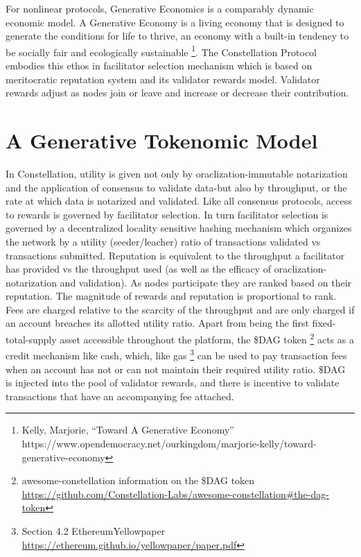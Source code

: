 \documentclass{article}
\begin{document}
For nonlinear protocols, Generative Economics is a comparably dynamic economic model. A Generative Economy is a living economy that is designed to generate the conditions for life to thrive, an economy with a built-in tendency to be socially fair and ecologically sustainable 
\footnote{Kelly, Marjorie, ``Toward A Generative Economy'' \\ https://www.opendemocracy.net/ourkingdom/marjorie-kelly/toward-generative-economy}. 
The Constellation Protocol embodies this ethos in facilitator selection mechanism which is based on meritocratic reputation system and its validator rewards model. Validator rewards adjust as nodes join or leave and increase or decrease their contribution.

\section{A Generative Tokenomic Model}
In Constellation, utility is given not only by oraclization-immutable notarization and the application of consensus to validate data-but also by throughput, or the rate at which data is notarized and validated. Like all consensus protocols, access to rewards is governed by facilitator selection. In turn facilitator selection is governed by a decentralized locality sensitive hashing mechanism which organizes the network by a utility (seeder/leacher) ratio of transactions validated vs transactions submitted. Reputation is equivalent to the throughput a facilitator has provided vs the throughput used (as well as the efficacy of oraclization-notarization and validation). As nodes participate they are ranked based on their reputation. The magnitude of rewards and reputation is proportional to rank. Fees are charged relative to the scarcity of the throughput and are only charged if an account breaches its allotted utility ratio. Apart from being the first fixed-total-supply asset accessible throughout the platform, the \$DAG token 
\footnote{awesome-constellation information on the \$DAG token\\ \url{https://github.com/Constellation-Labs/awesome-constellation\#the-dag-token}} 
acts as a credit mechanism like cash, which, like gas
\footnote{Section 4.2 EthereumYellowpaper\\ \url{https://ethereum.github.io/yellowpaper/paper.pdf}} 
can be used to pay transaction fees when an account has not or can not maintain their required utility ratio. \$DAG is injected into the pool of validator rewards, and there is incentive to validate transactions that have an accompanying fee attached. 
\end{document}

